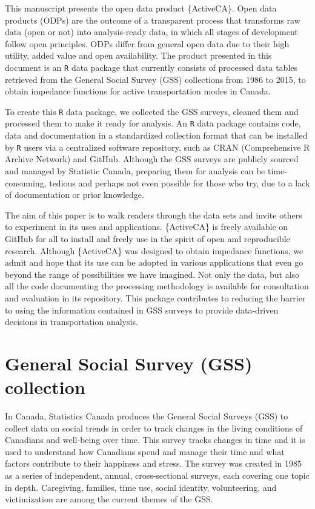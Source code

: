 \documentclass[Royal,times,sageh]{sagej}
\begin{document}
This manuscript presents the open data product \{ActiveCA\}. Open data
products (ODPs) are the outcome of a transparent process that transforms
raw data (open or not) into analysis-ready data, in which all stages of
development follow open principles. ODPs differ from general open data
due to their high utility, added value and open availability. The
product presented in this document is an \texttt{R} data package that
currently consists of processed data tables retrieved from the General
Social Survey (GSS) collections from 1986 to 2015, to obtain impedance
functions for active transportation modes in Canada.

To create this \texttt{R} data package, we collected the GSS surveys,
cleaned them and processed them to make it ready for analysis. An
\texttt{R} data package contains code, data and documentation in a
standardized collection format that can be installed by \texttt{R} users
via a centralized software repository, such as CRAN (Comprehensive R
Archive Network) and GitHub. Although the GSS surveys are publicly
sourced and managed by Statistic Canada, preparing them for analysis can
be time-consuming, tedious and perhaps not even possible for those who
try, due to a lack of documentation or prior knowledge.

The aim of this paper is to walk readers through the data sets and
invite others to experiment in its uses and applications. \{ActiveCA\}
is freely available on GitHub for all to install and freely use in the
spirit of open and reproducible research. Although \{ActiveCA\} was
designed to obtain impedance functions, we admit and hope that its use
can be adopted in various applications that even go beyond the range of
possibilities we have imagined. Not only the data, but also all the code
documenting the processing methodology is available for consultation and
evaluation in its repository. This package contributes to reducing the
barrier to using the information contained in GSS surveys to provide
data-driven decisions in transportation analysis.

\hypertarget{general-social-survey-gss-collection}{%
\section{General Social Survey (GSS)
collection}\label{general-social-survey-gss-collection}}

In Canada, Statistics Canada produces the General Social Surveys (GSS)
to collect data on social trends in order to track changes in the living
conditions of Canadians and well-being over time. This survey tracks
changes in time and it is used to understand how Canadians spend and
manage their time and what factors contribute to their happiness and
stress. The survey was created in 1985 as a series of independent,
annual, cross-sectional surveys, each covering one topic in depth.
Caregiving, families, time use, social identity, volunteering, and
victimization are among the current themes of the GSS.
\end{document}
